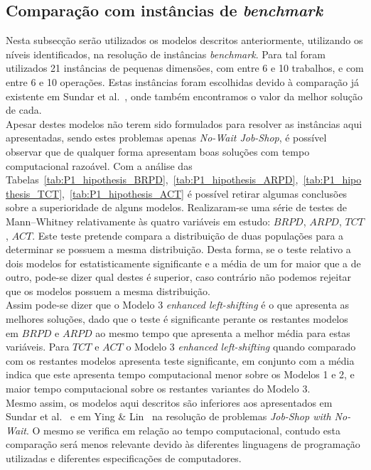 \subsection{Comparação com instâncias de \textit{benchmark}}

Nesta subsecção serão utilizados os modelos descritos anteriormente, utilizando os níveis identificados, na resolução de instâncias \textit{benchmark}. Para tal foram utilizados 21 instâncias de pequenas dimensões, com entre 6 e 10 trabalhos, e com entre 6 e 10 operações. Estas instâncias foram escolhidas devido à comparação já existente em Sundar et al.~\cite{sundarHybridArtificialBee2017}, onde também encontramos o valor da melhor solução de cada.\\

Apesar destes modelos não terem sido formulados para resolver as instâncias aqui apresentadas, sendo estes problemas apenas \textit{No-Wait Job-Shop}, é possível observar que de qualquer forma apresentam boas soluções com tempo computacional razoável. Com a análise das Tabelas~\ref{tab:P1_hipothesis_BRPD},~\ref{tab:P1_hipothesis_ARPD},~\ref{tab:P1_hipothesis_TCT},~\ref{tab:P1_hipothesis_ACT} é possível retirar algumas conclusões sobre a superioridade de alguns modelos. Realizaram-se uma série de testes de Mann–Whitney relativamente às quatro variáveis em estudo: $BRPD$, $ARPD$, $TCT$, $ACT$. Este teste pretende compara a distribuição de duas populações para a determinar se possuem a mesma distribuição. Desta forma, se o teste relativo a dois modelos for estatisticamente significante e a média de um for maior que a de outro, pode-se dizer qual destes é superior, caso contrário não podemos rejeitar que os modelos possuem a mesma distribuição.\\

Assim pode-se dizer que o Modelo 3 \textit{enhanced left-shifting} é o que apresenta as melhores soluções, dado que o teste é significante perante os restantes modelos em $BRPD$ e $ARPD$ ao mesmo tempo que apresenta a melhor média para estas variáveis. Para $TCT$ e $ACT$ o Modelo 3 \textit{enhanced left-shifting} quando comparado com os restantes modelos apresenta teste significante, em conjunto com a média indica que este apresenta tempo computacional menor sobre os Modelos 1 e 2, e maior tempo computacional sobre os restantes variantes do Modelo 3.\\

Mesmo assim, os modelos aqui descritos são inferiores aos apresentados em Sundar et al.~\cite{sundarHybridArtificialBee2017} e em Ying \& Lin~\cite{yingSolvingNowaitJobshop2020} na resolução de problemas \textit{Job-Shop with No-Wait}. O mesmo se verifica em relação ao tempo computacional, contudo esta comparação será menos relevante devido às diferentes linguagens de programação utilizadas e diferentes especificações de computadores.\\

